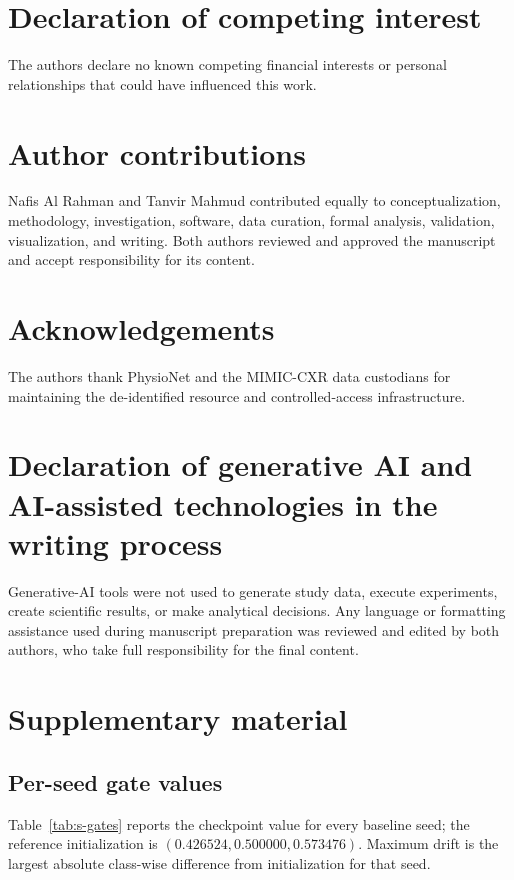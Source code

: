 \documentclass[10pt,a4paper,twocolumn]{article}
\begin{document}
\section*{Declaration of competing interest}
The authors declare no known competing financial interests or personal
relationships that could have influenced this work.

\section*{Author contributions}
Nafis Al Rahman and Tanvir Mahmud contributed equally to conceptualization,
methodology, investigation, software, data curation, formal analysis,
validation, visualization, and writing. Both authors reviewed and approved the
manuscript and accept responsibility for its content.

\section*{Acknowledgements}
The authors thank PhysioNet and the MIMIC-CXR data custodians for maintaining
the de-identified resource and controlled-access infrastructure.

\section*{Declaration of generative AI and AI-assisted technologies in the writing process}
Generative-AI tools were not used to generate study data, execute experiments,
create scientific results, or make analytical decisions. Any language or
formatting assistance used during manuscript preparation was reviewed and
edited by both authors, who take full responsibility for the final content.

\appendix
\setcounter{table}{0}
\setcounter{figure}{0}
\renewcommand{\thesection}{S}
\renewcommand{\thetable}{S\arabic{table}}
\renewcommand{\thefigure}{S\arabic{figure}}
\section{Supplementary material}

\subsection{Per-seed gate values}

Table~\ref{tab:s-gates} reports the checkpoint value for every baseline seed;
the reference initialization is $(0.426524,0.500000,0.573476)$. Maximum drift
is the largest absolute class-wise difference from initialization for that
seed.
\end{document}
